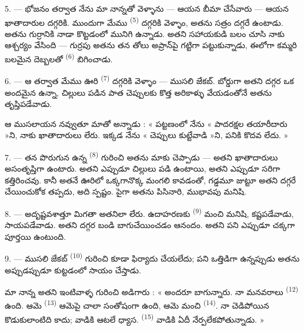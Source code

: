 \VUsaut{3.0mm}

5. --- భోజనం తర్వాత నేను మా నాన్నతో వెళ్ళాను — ఆయన బీమా చేసేవారు — ఆయన ఖాతాదారుల దగ్గరికి.
ముందుగా మేము  \textsuperscript{(5)} దగ్గరికి వెళ్ళాం, అతను సత్రం దగ్గరే ఉంటాడు.
అతను గుర్రానికి నాడా కొట్టడంలో మునిగి ఉన్నాడు. అతని సహాయకుడి బలం చూసి నాకు ఆశ్చర్యం వేసింది —
గుర్రపు  అతను తన తోలు అప్రాన్‌పై గట్టిగా పట్టుకున్నాడు, ఈలోగా కమ్మరి బలమైన
దెబ్బలతో  \textsuperscript{(6)} బిగించాడు.

6. --- ఆ తర్వాత మేము ఊరి  \textsuperscript{(7)} దగ్గరికి వెళ్ళాం —
ముసలి జేకబ్. బోర్డుగా అతని దగ్గర ఒక అందమైన  ఉన్నా, చిల్లులు పడిన పాత చెప్పులకు
కొత్త అరికాళ్ళు వేయడంతోనే అతను తృప్తిపడేవాడు.

ఆ ముసలాయన నవ్వుతూ మాతో అన్నాడు : « పట్టణంలో నేను « పాదరక్షల తయారీదారు »ని, నాకు ఖాతాదారులు
లేరు. ఇక్కడ నేను « చెప్పులు కుట్టేవాడి »ని, పనికి కొదవ లేదు. »

7. --- తన పొరుగున ఉన్న  \textsuperscript{(8)} గురించి అతను మాకు చెప్పాడు — అతని
ఖాతాదారులు అసంతృప్తిగా ఉంటారు. అతని  ఎప్పుడూ చిల్లులు పడి ఉంటాయి, అతని
 ఎప్పుడూ సరిగా కత్తిరించవు. కానీ అతనే ఊరిలో ఒక్కగానొక్క మంగలి కావడంతో, గడ్డమూ
జుట్టూ అతని దగ్గరే చేయించుకోక తప్పదు, అది స్పష్టం. పైగా అతను పిసినారి, ముభావపు మనిషి.

8. --- అదృష్టవశాత్తూ మిగతా  అతనిలా లేరు. ఉదాహరణకు
 \textsuperscript{(9)} మంచి మనిషి, కష్టపడేవాడు, సాయపడేవాడు. అతని దగ్గర
బండి బాగుచేయించడం ఆనందం. అతని పని ఎప్పుడూ చక్కగా పూర్తయి ఉంటుంది.

9. --- ముసలి జేకబ్  \textsuperscript{(10)} గురించి కూడా ఫిర్యాదు
చేయలేదు; పని ఒత్తిడిగా ఉన్నప్పుడు అతను అప్పుడప్పుడూ  కుట్టడంలో సాయం
చేస్తాడు.

మా నాన్న అతని ఇంటివాళ్ళ గురించి అడిగారు : « అందరూ బాగున్నారు. నా మనవరాలు 
\textsuperscript{(12)} ఉంది. ఆమె  \textsuperscript{(13)} ఆమెపై చాలా
సంతోషంగా ఉంది, ఆమె మంచి  \textsuperscript{(14)}. నా చెడిపోయిన
కొడుకులాంటిది కాదు; వాడికి ఆటలే ధ్యాస.  \textsuperscript{(15)} వాడికి ఏదీ
నేర్పలేకపోతున్నాడు. »

\VUsaut{3.0mm}
\VUsaut{3.0mm}

